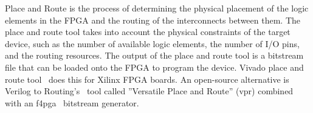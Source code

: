 Place and Route is the process of determining the physical placement of the logic elements in the FPGA and the routing of the interconnects between them. The place and route tool takes into account the physical constraints of the target device, such as the number of available logic elements, the number of I/O pins, and the routing resources. The output of the place and route tool is a bitstream file that can be loaded onto the FPGA to program the device. Vivado place and route tool~\cite{vivado_implementation} does this for Xilinx FPGA boards. An open-source alternative is Verilog to Routing's~\cite{vtr8} tool called ''Versatile Place and Route'' (vpr) combined with an f4pga~\cite{f4pga} bitstream generator. 